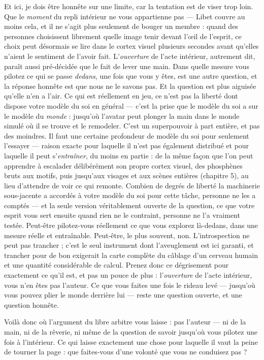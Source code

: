 \documentclass[11pt, twoside, openright]{book}
\begin{document}
Et ici, je dois être honnête sur une limite, car la tentation est de viser trop loin. Que le \textit{moment} du repli intérieur ne vous appartienne pas --- Libet couvre au moins cela, et il ne s'agit plus seulement de bouger un membre : quand des personnes choisissent librement quelle image tenir devant l'œil de l'esprit, ce choix peut désormais se lire dans le cortex visuel plusieurs secondes avant qu'elles n'aient le sentiment de l'avoir fait. L'\textit{ouverture} de l'acte intérieur, autrement dit, paraît aussi pré-décidée que le fait de lever une main. Dans quelle mesure vous pilotez ce qui se passe \textit{dedans}, une fois que vous y êtes, est une autre question, et la réponse honnête est que nous ne le savons pas. Et la question est plus aiguisée qu'elle n'en a l'air. Ce qui est réellement en jeu, ce n'est pas la liberté dont dispose votre modèle du soi en général --- c'est la prise que le modèle du soi a sur le modèle du \textit{monde} : jusqu'où l'avatar peut plonger la main dans le monde simulé où il se trouve et le remodeler. C'est un superpouvoir à part entière, et pas des moindres. Il faut une certaine profondeur de modèle du soi pour seulement l'essayer --- raison exacte pour laquelle il n'est pas également distribué et pour laquelle il peut s'\textit{entraîner}, du moins en partie : de la même façon que l'on peut apprendre à escalader délibérément son propre cortex visuel, des phosphènes bruts aux motifs, puis jusqu'aux visages et aux scènes entières (chapitre 5), au lieu d'attendre de voir ce qui remonte. Combien de degrés de liberté la machinerie sous-jacente a accordés à votre modèle du soi pour cette tâche, personne ne les a comptés --- et la seule version véritablement ouverte de la question, ce que votre esprit vous sert ensuite quand rien ne le contraint, personne ne l'a vraiment testée. Peut-être pilotez-vous réellement ce que vous explorez là-dedans, dans une mesure réelle et entraînable. Peut-être, le plus souvent, non. L'introspection ne peut pas trancher ; c'est le seul instrument dont l'aveuglement est ici garanti, et trancher pour de bon exigerait la carte complète du câblage d'un cerveau humain et une quantité considérable de calcul. Prenez donc ce dégrisement pour exactement ce qu'il est, et pas un pouce de plus : l'\textit{ouverture} de l'acte intérieur, vous n'en êtes pas l'auteur. Ce que vous faites une fois le rideau levé --- jusqu'où vous pouvez plier le monde derrière lui --- reste une question ouverte, et une question honnête.

Voilà donc où l'argument du libre arbitre vous laisse : pas l'auteur --- ni de la main, ni de la rêverie, ni même de la question de savoir jusqu'où vous pilotez une fois à l'intérieur. Ce qui laisse exactement une chose pour laquelle il vaut la peine de tourner la page : que faites-vous d'une volonté que vous ne conduisez pas ?
\end{document}
